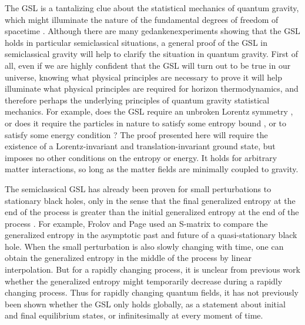 \documentclass[12pt]{article}
\begin{document}
The GSL is a tantalizing clue about the statistical mechanics of quantum gravity, which might illuminate the nature of the fundamental degrees of freedom of spacetime \cite{sorkin83}\cite{JP07}.  Although there are many gedankenexperiments showing that the GSL holds in particular semiclassical situations, a general proof of the GSL in semiclassical gravity will help to clarify the situation in quantum gravity.  First of all, even if we are highly confident that the GSL will turn out to be true in our universe, knowing what physical principles are necessary to prove it will help illuminate what physical principles are required for horizon thermodynamics, and therefore perhaps the underlying principles of quantum gravity statistical mechanics.  For example, does the GSL require an unbroken Lorentz symmetry \cite{EFJW07}, or does it require the particles in nature to satisfy some entropy bound \cite{bounds}, or to satisfy some energy condition \cite{energy}?  The proof presented here will require the existence of a Lorentz-invariant and translation-invariant ground state, but imposes no other conditions on the entropy or energy.  It holds for arbitrary matter interactions, so long as the matter fields are minimally coupled to gravity.

The semiclassical GSL has already been proven for small perturbations to stationary black holes, only in the sense that the final generalized entropy at the end of the process is greater than the initial generalized entropy at the end of the process \cite{10proofs}.  For example, Frolov and Page \cite{FP93} used an S-matrix to compare the generalized entropy in the asymptotic past and future of a quasi-stationary black hole.  When the small perturbation is also slowly changing with time, one can obtain the generalized entropy in the middle of the process by linear interpolation.  But for a rapidly changing process, it is unclear from previous work whether the generalized entropy might temporarily decrease during a rapidly changing process.  Thus for rapidly changing quantum fields, it has not previously been shown whether the GSL only holds globally, as a statement about initial and final equilibrium states, or infinitesimally at every moment of time.
\end{document}
